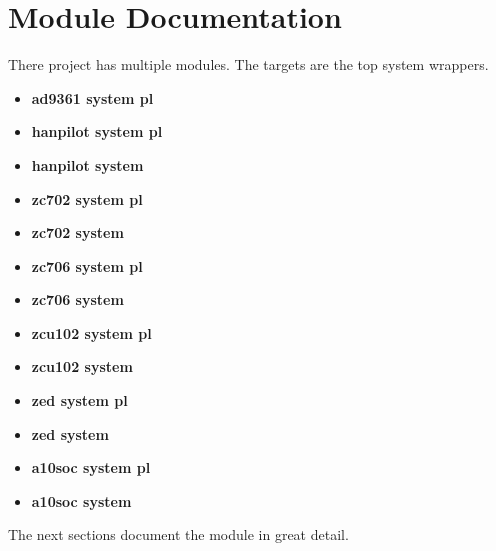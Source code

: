\newpage

\section{Module Documentation} \label{Module Documentation}

\par
There project has multiple modules. The targets are the top system wrappers.

\begin{itemize}
\item \textbf{ad9361 system pl}
\item \textbf{hanpilot system pl}
\item \textbf{hanpilot system}
\item \textbf{zc702 system pl}
\item \textbf{zc702 system}
\item \textbf{zc706 system pl}
\item \textbf{zc706 system}
\item \textbf{zcu102 system pl}
\item \textbf{zcu102 system}
\item \textbf{zed system pl}
\item \textbf{zed system}
\item \textbf{a10soc system pl}
\item \textbf{a10soc system}
\end{itemize}
The next sections document the module in great detail.

